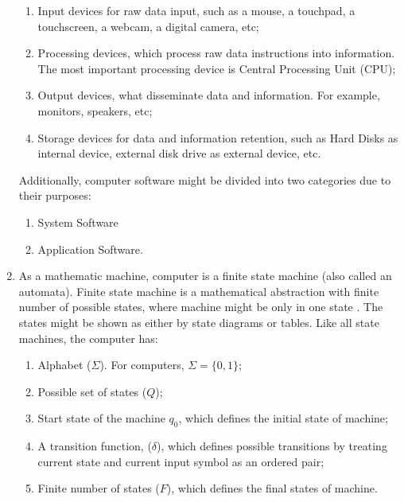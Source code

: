 \documentclass{scrartcl}
\begin{document}
\begin{Large}
\begin{enumerate}
\begin{enumerate}
\item Input devices for raw data input, such as a mouse, a touchpad, a touchscreen, a webcam, a digital camera, etc;
\item Processing devices, which process raw data instructions into information. The most important processing device is Central Processing Unit (CPU);
\item Output devices, what disseminate data and information. For example, monitors, speakers, etc;
\item Storage devices for data and information retention, such as Hard Disks as internal device, external disk drive as external device, etc.

\end{enumerate}

Additionally, computer software might be divided into two categories due to their purposes:

\begin{enumerate}

\item System Software
\item Application Software.

\end{enumerate}

\item As a mathematic machine, computer is a finite state machine (also called an automata). Finite state machine is a mathematical abstraction with finite number of possible states, where machine might be only in one state \cite{internetwebsite3}. The states might be shown as either by state diagrams or tables. Like all state machines, the computer has:

\begin{enumerate}

\item Alphabet ($\Sigma$). For computers, $ \Sigma = \{0, 1\} $;

\item Possible set of states ($Q$);

\item Start state of the machine $ q_{0} $, which defines the initial state of machine;

\item A transition function, ($\delta$), which defines possible transitions by treating current state and current input symbol as an ordered pair;

\item Finite number of states ($F$), which defines the final states of machine.


\end{enumerate}
\end{enumerate}
\end{Large}
\end{document}
